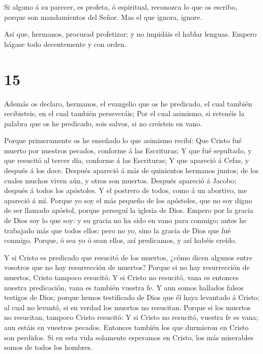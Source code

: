  Si alguno á su parecer, es profeta, ó espiritual,
reconozca lo que os escribo, porque son mandamientos del Señor.
 Mas el que ignora, ignore.

 Así que, hermanos, procurad profetizar; y no impidáis el
hablar lenguas.  Empero hágase todo decentemente y con
orden.

\hypertarget{section-14}{%
\section{15}\label{section-14}}

 Además os declaro, hermanos, el evangelio que os he
predicado, el cual también recibisteis, en el cual también perseveráis;
 Por el cual asimismo, si retenéis la palabra que os he
predicado, sois salvos, si no creísteis en vano.

 Porque primeramente os he enseñado lo que asimismo recibí:
Que Cristo fué muerto por nuestros pecados, conforme á las Escrituras;
 Y que fué sepultado, y que resucitó al tercer día, conforme
á las Escrituras;  Y que apareció á Cefas, y después á los
doce.  Después apareció á más de quinientos hermanos juntos;
de los cuales muchos viven aún, y otros son muertos. 
Después apareció á Jacobo; después á todos los apóstoles.  Y
el postrero de todos, como á un abortivo, me apareció á mí. 
Porque yo soy el más pequeño de los apóstoles, que no soy digno de ser
llamado apóstol, porque perseguí la iglesia de Dios. 
Empero por la gracia de Dios soy lo que soy: y su gracia no ha sido en
vano para conmigo; antes he trabajado más que todos ellos: pero no yo,
sino la gracia de Dios que fué conmigo.  Porque, ó sea yo ó
sean ellos, así predicamos, y así habéis creído.

 Y si Cristo es predicado que resucitó de los muertos,
¿cómo dicen algunos entre vosotros que no hay resurrección de muertos?
 Porque si no hay resurrección de muertos, Cristo tampoco
resucitó:  Y si Cristo no resucitó, vana es entonces
nuestra predicación, vana es también vuestra fe.  Y aun
somos hallados falsos testigos de Dios; porque hemos testificado de Dios
que él haya levantado á Cristo; al cual no levantó, si en verdad los
muertos no resucitan.  Porque si los muertos no resucitan,
tampoco Cristo resucitó:  Y si Cristo no resucitó, vuestra
fe es vana; aun estáis en vuestros pecados.  Entonces
también los que durmieron en Cristo son perdidos.  Si en
esta vida solamente esperamos en Cristo, los más miserables somos de
todos los hombres.

